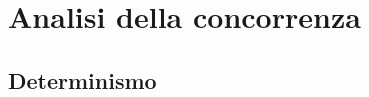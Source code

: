 \chapter{Analisi della concorrenza} %

\label{Chapter4} %



\section{Determinismo}
\label{epsilondeterminismo}

